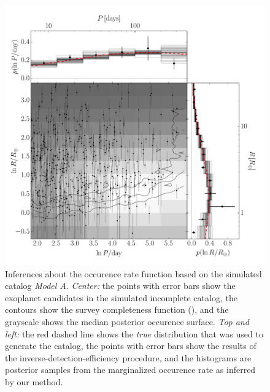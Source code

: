 \documentclass[12pt,preprint]{aastex}
\newcommand{\figlabel}[1]{\label{fig:#1}}
\newcommand{\modela}{\emph{Model A}}
\begin{document}
\begin{figure}[p]
\begin{center}
\includegraphics[width=\textwidth]{figures/smooth/results.pdf}
\end{center}
\caption{%
Inferences about the occurence rate function based on the simulated catalog
\modela.
\emph{Center:} the points with error bars show the exoplanet candidates in the
simulated incomplete catalog, the contours show the survey completeness
function (\citealt{petigura}), and the grayscale shows the median posterior
occurence surface.
\emph{Top and left:} the red dashed line shows the \emph{true} distribution
that was used to generate the catalog, the points with error bars show the
results of the inverse-detection-efficiency procedure, and the histograms are
posterior samples from the marginalized occurence rate as inferred by our
method.
\figlabel{smooth-results}}
\end{figure}
\end{document}
